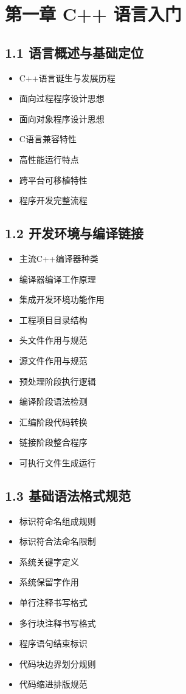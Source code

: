 \section{第一章 C++ 语言入门}
\subsection{1.1 语言概述与基础定位}
\begin{itemize}
\item C++语言诞生与发展历程
\item 面向过程程序设计思想
\item 面向对象程序设计思想
\item C语言兼容特性
\item 高性能运行特点
\item 跨平台可移植特性
\item 程序开发完整流程
\end{itemize}

\subsection{1.2 开发环境与编译链接}
\begin{itemize}
\item 主流C++编译器种类
\item 编译器编译工作原理
\item 集成开发环境功能作用
\item 工程项目目录结构
\item 头文件作用与规范
\item 源文件作用与规范
\item 预处理阶段执行逻辑
\item 编译阶段语法检测
\item 汇编阶段代码转换
\item 链接阶段整合程序
\item 可执行文件生成运行
\end{itemize}

\subsection{1.3 基础语法格式规范}
\begin{itemize}
\item 标识符命名组成规则
\item 标识符合法命名限制
\item 系统关键字定义
\item 系统保留字作用
\item 单行注释书写格式
\item 多行块注释书写格式
\item 程序语句结束标识
\item 代码块边界划分规则
\item 代码缩进排版规范
\end{itemize}

